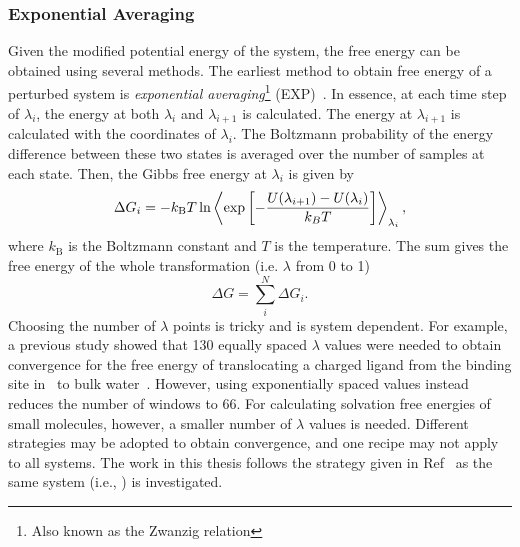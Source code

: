 \subsubsection{Exponential Averaging}
Given the modified potential energy of the system, the free energy can be obtained using several 
methods. The earliest method to obtain free energy of a perturbed system is {\it exponential 
averaging}\footnote{Also known as the Zwanzig relation} (EXP)~\cite{Beveridge1989}. In essence, 
at each time step of $\lambda_{i}$, the energy at both $\lambda_{i}$ and $\lambda_{i+1}$ is 
calculated. The energy at $\lambda_{i+1}$ is calculated with the coordinates of $\lambda_{i}$. 
The Boltzmann probability of the energy difference between these two states is averaged over the 
number of samples at each state. Then, the Gibbs free energy at $\lambda_{i}$ is given by
\begin{equation}
\Delta G_{i} = -k_{\text{B}}T \,\text{ln} \left\langle \text{exp}\left[-\frac{U(\lambda_{i+1})-U(\lambda_{i})}{k_{B}T} \right]\right\rangle_{\lambda_{i}},
\label{eq:zwanzig}
\end{equation}
where $k_{\text{B}}$ is the Boltzmann constant and $T$ is the temperature. The sum gives the free 
energy of the whole transformation (i.e. $\lambda$ from 0 to 1)
\begin{equation}
\Delta G = \sum_{i}^{N} \Delta G_{i}.
\label{eq:sumG}
\end{equation}
Choosing the number of $\lambda$ points is tricky and is system dependent. For example, a previous 
study showed that 130 equally spaced $\lambda$ values were needed to obtain convergence for the 
free energy of translocating a charged ligand from the binding site in \GltPh\ to bulk 
water~\cite{Heinzelmann2011}. However, using exponentially spaced values instead reduces the number 
of windows to 66. For calculating solvation free energies of small molecules, however, a smaller number 
of $\lambda$ values is needed. Different strategies may be adopted to obtain convergence, and one recipe 
may not apply to all systems. The work in this thesis follows the strategy given in 
Ref~\cite{Heinzelmann2011} as the same system (i.e., \GltPh) is investigated.


